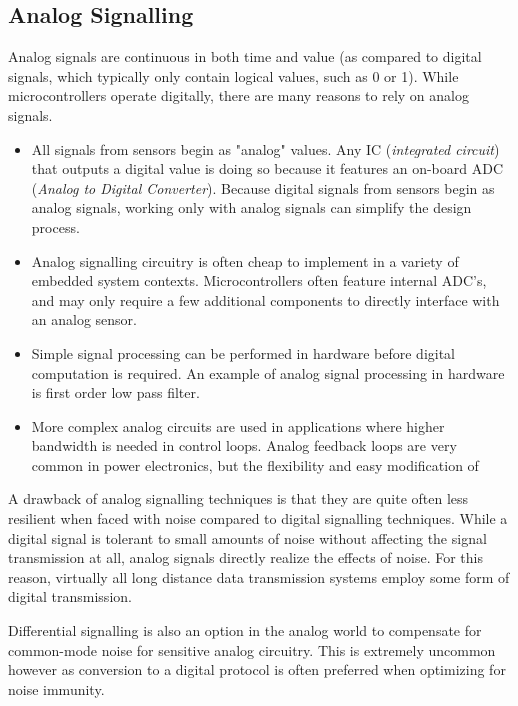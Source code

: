 \documentclass[main.tex]{subfiles}
\begin{document}

\subsection{Analog Signalling}
Analog signals are continuous in both time and value (as compared to digital signals, which typically only contain logical values, such as 0 or 1). While microcontrollers operate digitally, there are many reasons to rely on analog signals.
\begin{itemize}
    \item All signals from sensors begin as "analog" values. Any IC (\textit{integrated circuit}) that outputs a digital value is doing so because it features an on-board ADC (\textit{Analog to Digital Converter}). Because digital signals from sensors begin as analog signals, working only with analog signals can simplify the design process.
    \item Analog signalling circuitry is often cheap to implement in a variety of embedded system contexts. Microcontrollers often feature internal ADC's, and may only require a few additional components to directly interface with an analog sensor.
    \item Simple signal processing can be performed in hardware before digital computation is required. An example of analog signal processing in hardware is first order low pass filter. 
    \item More complex analog circuits are used in applications where higher bandwidth is needed in control loops. Analog feedback loops are very common in power electronics, but the flexibility and easy modification of %
\end{itemize}

\noindent A drawback of analog signalling techniques is that they are quite often less resilient when faced with noise compared to digital signalling techniques. While a digital signal is tolerant to small amounts of noise without affecting the signal transmission at all, analog signals directly realize the effects of noise. For this reason, virtually all long distance data transmission systems employ some form of digital transmission. \newline

\newnoindentpara Differential signalling is also an option in the analog world to compensate for common-mode noise for sensitive analog circuitry. This is extremely uncommon however as conversion to a digital protocol is often preferred when optimizing for noise immunity. 
\end{document}
